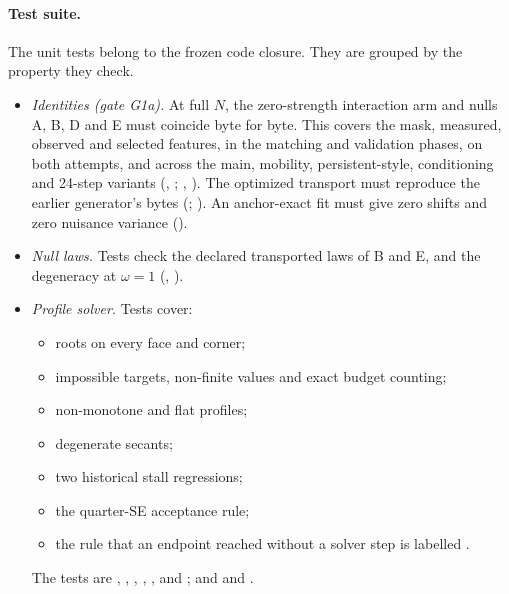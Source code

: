 \paragraph{Test suite.}
The unit tests belong to the frozen code closure. They are grouped by the property they check.
\begin{itemize}
\item \emph{Identities (gate G1a).} At full $N$, the zero-strength interaction arm and nulls A, B, D and E must coincide byte for byte. This covers the mask, measured, observed and selected features, in the matching and validation phases, on both attempts, and across the main, mobility, persistent-style, conditioning and 24-step variants (, ; , ). The optimized transport must reproduce the earlier generator's bytes (; ). An anchor-exact fit must give zero shifts and zero nuisance variance ().
\item \emph{Null laws.} Tests check the declared transported laws of B and E, and the degeneracy at $\omega=1$ (, ).
\item \emph{Profile solver.} Tests cover:
  \begin{itemize}
  \item roots on every face and corner;
  \item impossible targets, non-finite values and exact budget counting;
  \item non-monotone and flat profiles;
  \item degenerate secants;
  \item two historical stall regressions;
  \item the quarter-SE acceptance rule;
  \item the rule that an endpoint reached without a solver step is labelled .
  \end{itemize}
  The tests are , , , , ,  and ; and  and .

\end{itemize}

